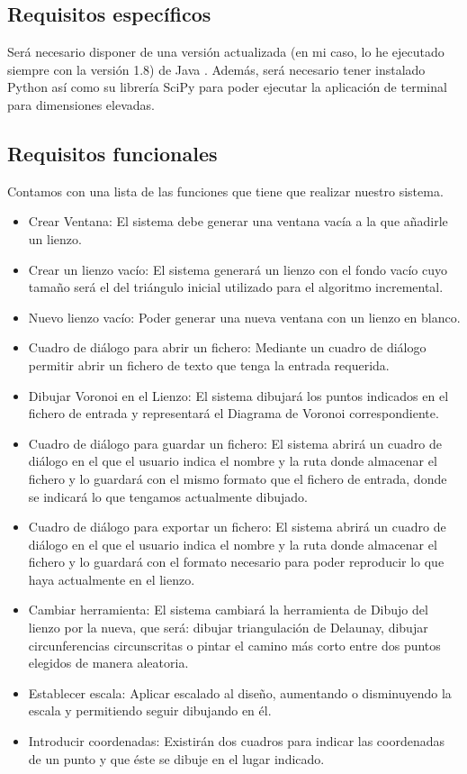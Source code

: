 \subsection{Requisitos específicos}

Será necesario disponer de una versión actualizada (en mi caso, lo he ejecutado siempre con la versión 1.8) de Java \cite{java}. Además, será necesario tener instalado Python \cite{python} así como su librería SciPy \cite{pythonclass} para poder ejecutar la aplicación de terminal para dimensiones elevadas.

\subsection{Requisitos funcionales}

Contamos con una lista de las funciones que tiene que realizar nuestro sistema. 

\begin{itemize}
    \item[\ding{224}] Crear Ventana: El sistema debe generar una ventana vacía a la que añadirle un lienzo.
    \item[\ding{224}] Crear un lienzo vacío: El sistema generará un lienzo con el fondo vacío cuyo tamaño será el del triángulo inicial utilizado para el algoritmo incremental.
    \item[\ding{224}] Nuevo lienzo vacío: Poder generar una nueva ventana con un lienzo en blanco.
    \item[\ding{224}] Cuadro de diálogo para abrir un fichero: Mediante un cuadro de diálogo permitir abrir un fichero de texto que tenga la entrada requerida.
    \item[\ding{224}] Dibujar Voronoi en el Lienzo: El sistema dibujará los puntos indicados en el fichero de entrada y representará el Diagrama de Voronoi correspondiente.
    \item[\ding{224}] Cuadro de diálogo para guardar un fichero: El sistema abrirá un cuadro de diálogo en el que el usuario indica el nombre y la ruta donde almacenar el fichero y lo guardará con el mismo formato que el fichero de entrada, donde se indicará lo que tengamos actualmente dibujado.
    \item[\ding{224}] Cuadro de diálogo para exportar un fichero: El sistema abrirá un cuadro de diálogo en el que el usuario indica el nombre y la ruta donde almacenar el fichero y lo guardará con el formato necesario para poder reproducir lo que haya actualmente en el lienzo.
    \item[\ding{224}] Cambiar herramienta: El sistema cambiará la herramienta de Dibujo del lienzo por la nueva, que será: dibujar triangulación de Delaunay, dibujar circunferencias circunscritas o pintar el camino más corto entre dos puntos elegidos de manera aleatoria.
    \item[\ding{224}] Establecer escala: Aplicar escalado al diseño, aumentando o disminuyendo la escala y permitiendo seguir dibujando en él.
    \item[\ding{224}] Introducir coordenadas: Existirán dos cuadros para indicar las coordenadas de un punto y que éste se dibuje en el lugar indicado.
\end{itemize}

